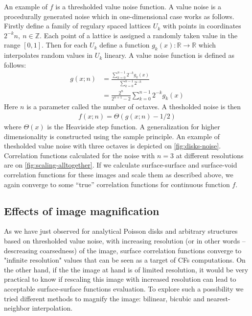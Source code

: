\documentclass[reprint,amsmath,amssymb,aps,pre,showkeys,showpacs]{revtex4-1}
\begin{document}
An example of $f$ is a thresholded value noise function. A value noise is a
procedurally generated noise which in one-dimensional case works as
follows. Firstly define a family of regulary spaced lattices $U_k$ with points
in coordinates $2^{-k}n,\ n \in \mathbb{Z}$. Each point of a lattice is assigned
a randomly taken value in the range $[0, 1]$. Then for each $U_k$ define a
function $g_k(x): \mathbb{R} \rightarrow \mathbb{R}$ which interpolates random
values in $U_k$ lineary. A value noise function is defined as follows:
\begin{align*}
  g(x; n) &= \frac{\sum\limits_{k=0}^{n-1} 2^{-k}g_k(x)}{\sum\limits_{k=0}^{n-1}
    2^{-k}} \\
  &= \frac{2^n}{2^{n+1}-2} \sum\limits_{k=0}^{n-1} 2^{-k}g_k(x)
\end{align*}
Here $n$ is a parameter called the number of octaves. A thesholded noise is then
\begin{align*}
  f(x; n) = \Theta(g(x; n) - 1/2)
\end{align*}
where $\Theta(x)$ is the Heaviside step function. A generalization for higher
dimensionality is constructed using the sample principle. An example of
thesholded value noise with three octaves is depicted on
\cref{fig:disks-noise}. Correlation functions calculated for the noise with
$n = 3$ at different resolutions are on \cref{fig:scaling-alltogether}. If we
calculate surface-surface and surface-void correlation functions for these
images and scale them as described above, we again converge to some ``true''
correlation functions for continuous function $f$.

\subsection{Effects of image magnification}
\label{sec:magnify}
As we have just observed for analytical Poisson disks and arbitrary structures
based on thresholded value noise, with increasing resolution (or in other words
-- descreasing coarsedness) of the image, surface correlation functions converge
to "infinite resolution" values that can be seen as a target of CFs
computations. On the other hand, if the the image at hand is of limited
resolution, it would be very practical to know if rescaling this image with
increased resolution can lead to acceptable surface-surface functions
evaluation. To explore such a possibility we tried different methods to magnify
the image: bilinear, bicubic and nearest-neighbor interpolation.
\end{document}
